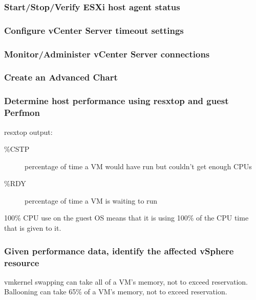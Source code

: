 \subsubsection{Start/Stop/Verify ESXi host agent status}

\subsubsection{Configure vCenter Server timeout settings}

\subsubsection{Monitor/Administer vCenter Server connections}

\subsubsection{Create an Advanced Chart}

\subsubsection{Determine host performance using resxtop and guest Perfmon}

resxtop output:

\begin{description}

\item[\%CSTP]
percentage of time a VM would have run but couldn't get enough CPUs

\item[\%RDY]
percentage of time a VM is waiting to run

\end{description}

100\% CPU use on the guest OS means that it is using 100\% of the CPU time
that is given to it.

\subsubsection{Given performance data, identify the affected vSphere resource}

vmkernel swapping can take all of a VM's memory, not to exceed reservation.\\

Ballooning can take 65\% of a VM's memory, not to exceed reservation.
